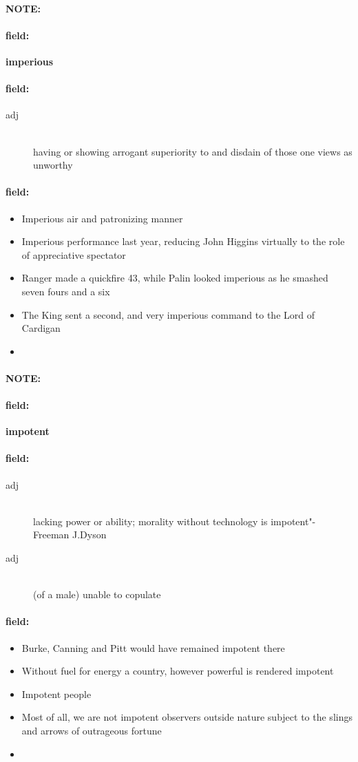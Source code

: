 \documentclass[12pt]{article}
\newenvironment{note}{\paragraph{NOTE:}}{}
\newenvironment{field}{\paragraph{field:}}{}
\begin{document}
\begin{note}
\begin{field}
\textbf{\large imperious}
\end{field}


\begin{field}
\begin{description}
\item[adj] \hfill \\ 
having or showing arrogant superiority to and disdain of those one views as unworthy

\end{description}
\end{field}

\begin{field}
\begin{itemize}
\item Imperious air and patronizing manner
\item Imperious performance last year, reducing John Higgins virtually to the role of appreciative spectator
\item Ranger made a quickfire 43, while Palin looked imperious as he smashed seven fours and a six
\item The King sent a second, and very imperious command to the Lord of Cardigan
\item 
\end{itemize}
\end{field}
\end{note}
\begin{note}
\begin{field}
\textbf{\large impotent}
\end{field}


\begin{field}
\begin{description}
\item[adj] \hfill \\ 
lacking power or ability; morality without technology is impotent"- Freeman J.Dyson

\item[adj] \hfill \\ 
(of a male) unable to copulate

\end{description}
\end{field}

\begin{field}
\begin{itemize}
\item Burke, Canning and Pitt would have remained impotent there
\item Without fuel for energy a country, however powerful is rendered impotent
\item Impotent people
\item Most of all, we are not impotent observers outside nature subject to the slings and arrows of outrageous fortune
\item 
\end{itemize}
\end{field}
\end{note}
\end{document}
